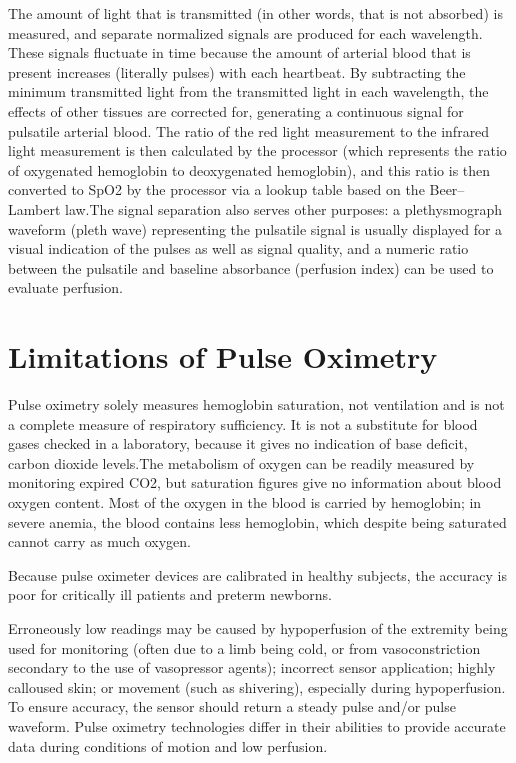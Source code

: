 \documentclass[12pt]{article}
\begin{document}
The amount of light that is transmitted (in other words, that is not absorbed) is measured, and separate normalized signals are produced for each wavelength. These signals fluctuate in time because the amount of arterial blood that is present increases (literally pulses) with each heartbeat. By subtracting the minimum transmitted light from the transmitted light in each wavelength, the effects of other tissues are corrected for, generating a continuous signal for pulsatile arterial blood. The ratio of the red light measurement to the infrared light measurement is then calculated by the processor (which represents the ratio of oxygenated hemoglobin to deoxygenated hemoglobin), and this ratio is then converted to SpO2 by the processor via a lookup table based on the Beer–Lambert law.The signal separation also serves other purposes: a plethysmograph waveform (pleth wave) representing the pulsatile signal is usually displayed for a visual indication of the pulses as well as signal quality, and a numeric ratio between the pulsatile and baseline absorbance (perfusion index) can be used to evaluate perfusion.


\section{Limitations of Pulse Oximetry}

Pulse oximetry solely measures hemoglobin saturation, not ventilation and is not a complete measure of respiratory sufficiency. It is not a substitute for blood gases checked in a laboratory, because it gives no indication of base deficit, carbon dioxide levels.The metabolism of oxygen can be readily measured by monitoring expired CO2, but saturation figures give no information about blood oxygen content. Most of the oxygen in the blood is carried by hemoglobin; in severe anemia, the blood contains less hemoglobin, which despite being saturated cannot carry as much oxygen.

Because pulse oximeter devices are calibrated in healthy subjects, the accuracy is poor for critically ill patients and preterm newborns.

Erroneously low readings may be caused by hypoperfusion of the extremity being used for monitoring (often due to a limb being cold, or from vasoconstriction secondary to the use of vasopressor agents); incorrect sensor application; highly calloused skin; or movement (such as shivering), especially during hypoperfusion. To ensure accuracy, the sensor should return a steady pulse and/or pulse waveform. Pulse oximetry technologies differ in their abilities to provide accurate data during conditions of motion and low perfusion.
\end{document}
